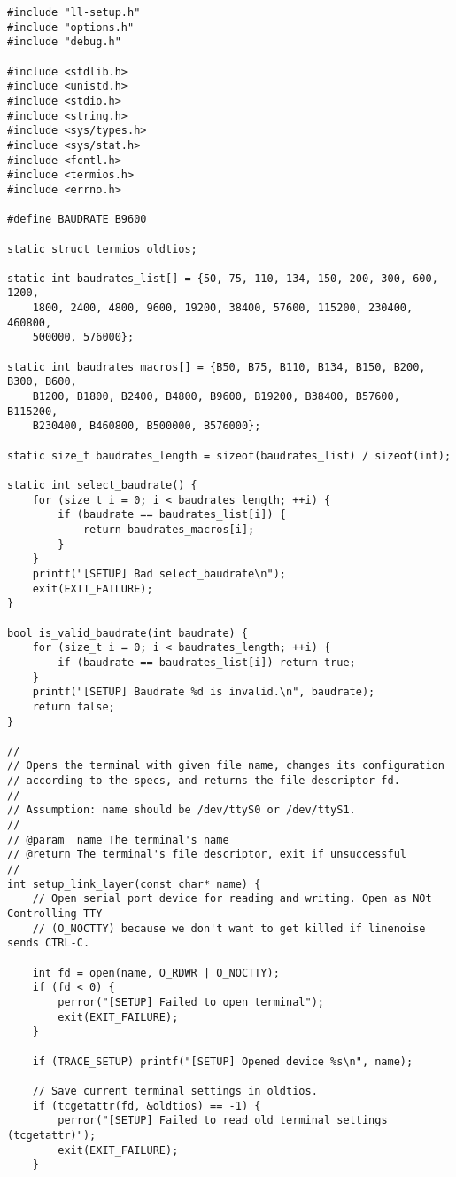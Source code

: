 \documentclass[subfiles]{main.tex}
\begin{document}
\begin{lstlisting}[style=rcom]
#include "ll-setup.h"
#include "options.h"
#include "debug.h"

#include <stdlib.h>
#include <unistd.h>
#include <stdio.h>
#include <string.h>
#include <sys/types.h>
#include <sys/stat.h>
#include <fcntl.h>
#include <termios.h>
#include <errno.h>

#define BAUDRATE B9600

static struct termios oldtios;

static int baudrates_list[] = {50, 75, 110, 134, 150, 200, 300, 600, 1200,
	1800, 2400, 4800, 9600, 19200, 38400, 57600, 115200, 230400, 460800,
	500000, 576000};

static int baudrates_macros[] = {B50, B75, B110, B134, B150, B200, B300, B600,
	B1200, B1800, B2400, B4800, B9600, B19200, B38400, B57600, B115200,
	B230400, B460800, B500000, B576000};

static size_t baudrates_length = sizeof(baudrates_list) / sizeof(int);

static int select_baudrate() {
	for (size_t i = 0; i < baudrates_length; ++i) {
		if (baudrate == baudrates_list[i]) {
			return baudrates_macros[i];
		}
	}
	printf("[SETUP] Bad select_baudrate\n");
	exit(EXIT_FAILURE);
}

bool is_valid_baudrate(int baudrate) {
	for (size_t i = 0; i < baudrates_length; ++i) {
		if (baudrate == baudrates_list[i]) return true;
	}
	printf("[SETUP] Baudrate %d is invalid.\n", baudrate);
	return false;
}

//
// Opens the terminal with given file name, changes its configuration
// according to the specs, and returns the file descriptor fd.
//
// Assumption: name should be /dev/ttyS0 or /dev/ttyS1.
//
// @param  name The terminal's name
// @return The terminal's file descriptor, exit if unsuccessful
//
int setup_link_layer(const char* name) {
	// Open serial port device for reading and writing. Open as NOt Controlling TTY
	// (O_NOCTTY) because we don't want to get killed if linenoise sends CTRL-C.
	
	int fd = open(name, O_RDWR | O_NOCTTY);
	if (fd < 0) {
		perror("[SETUP] Failed to open terminal");
		exit(EXIT_FAILURE);
	}
	
	if (TRACE_SETUP) printf("[SETUP] Opened device %s\n", name);
	
	// Save current terminal settings in oldtios.
	if (tcgetattr(fd, &oldtios) == -1) {
		perror("[SETUP] Failed to read old terminal settings (tcgetattr)");
		exit(EXIT_FAILURE);
	}
	

\end{lstlisting}
\end{document}

